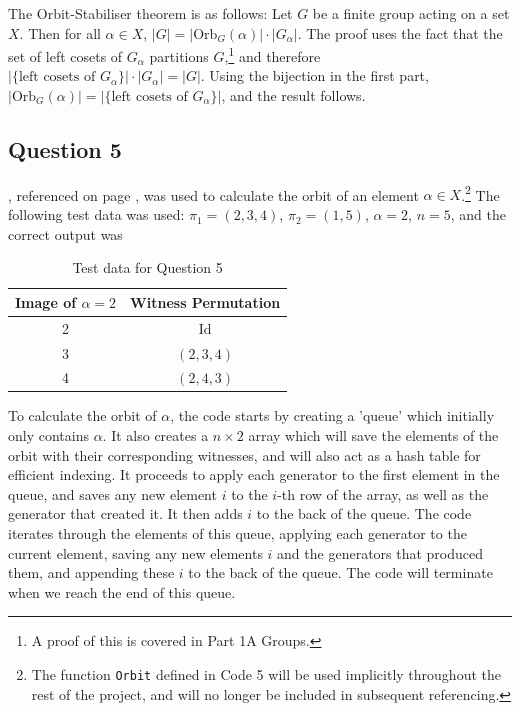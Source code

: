 \documentclass[10pt,a4paper,notitlepage]{article}
\newcommand{\abs}[1]{\lvert#1\rvert}
\newcommand{\Orb}{\text{Orb}}
\newcommand{\Id}{\text{Id}}
\begin{document}
The Orbit-Stabiliser theorem is as follows: Let $G$ be a finite group acting on a set $X$. Then for all $\alpha\in X$, $\abs{G}=\abs{\Orb_{G}\left(\alpha\right)} \cdot \abs{G_{\alpha}}$. The proof uses the fact that the set of left cosets of $G_{\alpha}$ partitions $G$,\footnote{A proof of this is covered in Part 1A Groups.} and therefore $\abs{\lbrace \text{left cosets of }G_{\alpha}\rbrace}\cdot \abs{G_{\alpha}}=\abs{G}$. Using the bijection in the first part, $\abs{\Orb_{G}\left(\alpha\right)}=\abs{\lbrace \text{left cosets of } G_{\alpha}\rbrace}$, and the result follows. 

\subsection*{\centering Question 5}
, referenced on page \pageref{cd:5}, was used to calculate the orbit of an element $\alpha\in X$.\footnote{The function \texttt{Orbit} defined in Code 5 will be used implicitly throughout the rest of the project, and will no longer be included in subsequent referencing.} The following test data was used: $\pi_{1}=(2,3,4)$, $\pi_{2}=(1,5)$, $\alpha=2$, $n=5$, and the correct output was
\begin{table}[H]
\centering
\begin{tabular}{|c|c|}
\hline Image of $\alpha=2$ & Witness Permutation \\
\hline 2 & $\Id$\\
3 & $(2,3,4)$\\
4 & $(2,4,3)$\\
\hline
\end{tabular}
\caption{Test data for Question 5}
\end{table}
To calculate the orbit of $\alpha$, the code starts by creating a 'queue' which initially only contains $\alpha$. It also creates a $n\times 2$ array which will save the elements of the orbit with their corresponding witnesses, and will also act as a hash table for efficient indexing. It proceeds to apply each generator to the first element in the queue, and saves any new element $i$ to the $i$-th row of the array, as well as the generator that created it. It then adds $i$ to the back of the queue. The code iterates through the elements of this queue, applying each generator to the current element,  saving any new elements $i$ and the generators that produced them, and appending these $i$ to the back of the queue. The code will terminate when we reach the end of this queue.\\
\end{document}

